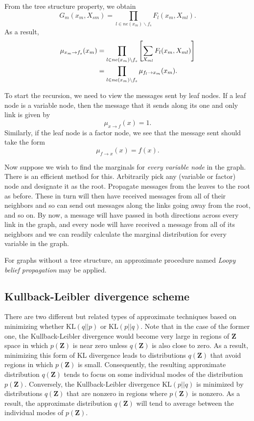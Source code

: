 \documentclass[a4paper]{report}
\newcommand{\up}{\mathrm}
\renewcommand{\bf}{\mathbf}
\newcommand{\imp}[1]{{\color{blue}\textit{#1}}}
\begin{document}
From the tree structure property, we obtain
\begin{equation}
	G_m(x_m, X_{sm}) = \prod_{l \in ne(x_m)\backslash f_s} F_l(x_m,X_{ml}).
\end{equation}
As a result,
\begin{align}
	\mu_{x_m \rightarrow f_s} (x_m) &= \prod_{l \in ne(x_m)\backslash f_s}\left[ \sum_{X_{ml}} F_l(x_m,X_{ml}) \right]\notag \\
	&= \prod_{l \in ne(x_m) \backslash f_s} \mu_{f_l \rightarrow x_m}(x_m).
\end{align}

To start the recursion, we need to view the messages sent by leaf nodes. If a leaf node is a variable node, then the message that it sends along its one and only link is given by
\begin{equation}
	\mu_{x \rightarrow f}(x) = 1.
\end{equation} 
Similarly, if the leaf node is a factor node, we see that the message sent should take the form
\begin{equation}
	\mu_{f \rightarrow x}(x) = f(x).
\end{equation}

Now suppose we wish to find the marginals for \imp{every variable node} in the graph. There is an efficient method for this. Arbitrarily pick any (variable or factor) node and designate it as the root. Propagate messages from the leaves to the root as before. These in turn will then have received messages from all of their neighbors and so can send out messages along the links going away from the root, and so on. By now, a message will have passed in both directions across every link in the graph, and every node will have received a message from all of its neighbors and we can readily calculate the marginal distribution for every variable in the graph.

For graphs without a tree structure, an approximate procedure named \imp{Loopy belief propagation} may be applied.
\subsection{Kullback-Leibler divergence scheme}
There are two different but related types of approximate techniques based on minimizing whether $\up{KL}(q||p)$ or $\up{KL}(p||q)$. Note that in the case of the former one, the Kullback-Leibler divergence would become very large in regions of $\bf{Z}$ space in which $p(\bf{Z})$ is near zero unless $q(\bf{Z})$ is also close to zero. As a result, minimizing this form of KL divergence leads to distributions $q(\bf{Z})$ that avoid regions in which $p(\bf{Z})$ is small. Consequently, the resulting approximate distribution $q(\bf{Z})$ tends to focus on some individual modes of the distribution $p(\bf{Z})$. Conversely, the Kullback-Leibler divergence $\up{KL}(p||q)$ is minimized by distributions $q(\bf{Z})$ that are nonzero in regions where $p(\bf{Z})$ is nonzero. As a result, the approximate distribution $q(\bf{Z})$ will tend to average between the individual modes of $p(\bf{Z})$.
\end{document}
